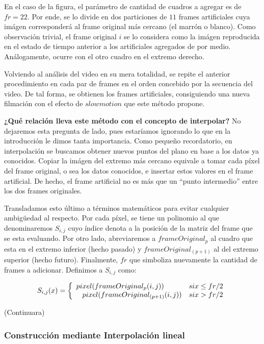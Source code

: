 En el caso de la figura, el par\'ametro de cantidad de cuadros a agregar es de $fr = 22$. Por ende, se lo divide en dos particiones de $11$ frames artificiales cuya im\'agen corresponder\'a al frame original m\'as cercano (el marr\'on o blanco). Como observaci\'on trivial, el frame original $i$ se lo considera como la im\'agen reproducida en el estado de tiempo anterior a los artificiales agregados de por medio. An\'alogamente, ocurre con el otro cuadro en el extremo derecho.

Volviendo al an\'alisis del video en su mera totalidad, se repite el anterior procedimiento en cada par de frames en el orden concebido por la secuencia del video. De tal forma, se obtienen los frames artificiales, consiguiendo una nueva filmaci\'on con el efecto de $slowmotion$ que este m\'etodo propone. 

\textbf{¿Qu\'e relaci\'on lleva este m\'etodo con el concepto de interpolar?} No dejaremos esta pregunta de lado, pues estar\'iamos ignorando lo que en la introducci\'on le dimos tanta importancia. Como pequeño recordatorio, en interpolaci\'on se buscamos obtener nuevos puntos del plano en base a los datos ya conocidos. Copiar la im\'agen del extremo m\'as cercano equivale a tomar cada p\'ixel del frame original, o sea los datos conocidos, e insertar estos valores en el frame artificial. De hecho, el frame artificial no es m\'as que un ``punto intermedio'' entre los dos frames originales.

Transladamos esto \'ultimo a t\'erminos matem\'aticos para evitar cualquier ambigüedad al respecto. Por cada p\'ixel, se tiene un polinomio al que denominaremos $S_{i,j}$ cuyo \'indice denota a la posici\'on de la matriz del frame que se esta evaluando. Por otro lado, abreviaremos a $frameOriginal_{p}$ al cuadro que esta en el extremo inferior (hecho pasado) y $frameOriginal_{(p+1)}$ al del extremo superior (hecho futuro). Finalmente, $fr$ que simboliza nuevamente la cantidad de frames a adicionar. Definimos a $S_{i,j}$ como:

\[
S_{i,j}(x) = 
\left\{
    \begin{array}{ll}
        pixel(frameOriginal_{p}(i,j)) & \mbox{si } x \leq fr/2 \\
        \hspace{0.3cm}     
        pixel(frameOriginal_{(p+1)}(i,j)) & \mbox{si } x > fr/2
    \end{array}
\right.
\]

(Continuara)

\subsubsection{Construcci\'on mediante Interpolaci\'on lineal}

